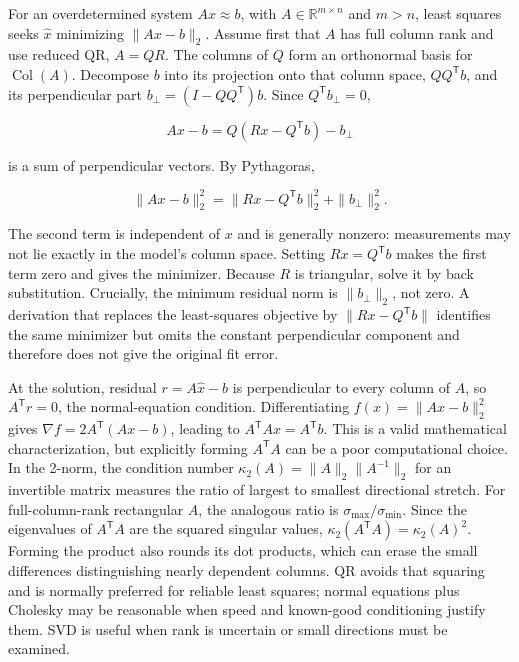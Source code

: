 \hypertarget{01-foundations-i-ch020-qr-turns-least-squares-into-a-triangular-solve-plus-an-irreducible-residual}{}

For an overdetermined system \(Ax\approx b\), with \(A\in\mathbb R^{m\times n}\) and \(m>n\), least squares seeks \(\hat x\) minimizing \(\|Ax-b\|_2\). Assume first that \(A\) has full column rank and use reduced QR, \(A=QR\). The columns of \(Q\) form an orthonormal basis for \(\operatorname{Col}(A)\). Decompose \(b\) into its projection onto that column space, \(QQ^\mathsf Tb\), and its perpendicular part \(b_\perp=(I-QQ^\mathsf T)b\). Since \(Q^\mathsf Tb_\perp=0\),

\[
Ax-b=Q(Rx-Q^\mathsf Tb)-b_\perp
\]

is a sum of perpendicular vectors. By Pythagoras,

\[
\|Ax-b\|_2^2=\|Rx-Q^\mathsf Tb\|_2^2+\|b_\perp\|_2^2.
\]

The second term is independent of \(x\) and is generally nonzero: measurements may not lie exactly in the model's column space. Setting \(Rx=Q^\mathsf Tb\) makes the first term zero and gives the minimizer. Because \(R\) is triangular, solve it by back substitution. Crucially, the minimum residual norm is \(\|b_\perp\|_2\), not zero. A derivation that replaces the least-squares objective by \(\|Rx-Q^\mathsf Tb\|\) identifies the same minimizer but omits the constant perpendicular component and therefore does not give the original fit error.

At the solution, residual \(r=A\hat x-b\) is perpendicular to every column of \(A\), so \(A^\mathsf Tr=0\), the normal-equation condition. Differentiating \(f(x)=\|Ax-b\|_2^2\) gives \(\nabla f=2A^\mathsf T(Ax-b)\), leading to \(A^\mathsf TAx=A^\mathsf Tb\). This is a valid mathematical characterization, but explicitly forming \(A^\mathsf TA\) can be a poor computational choice. In the 2-norm, the condition number \(\kappa_2(A)=\|A\|_2\|A^{-1}\|_2\) for an invertible matrix measures the ratio of largest to smallest directional stretch. For full-column-rank rectangular \(A\), the analogous ratio is \(\sigma_{\max}/\sigma_{\min}\). Since the eigenvalues of \(A^\mathsf TA\) are the squared singular values, \(\kappa_2(A^\mathsf TA)=\kappa_2(A)^2\). Forming the product also rounds its dot products, which can erase the small differences distinguishing nearly dependent columns. QR avoids that squaring and is normally preferred for reliable least squares; normal equations plus Cholesky may be reasonable when speed and known-good conditioning justify them. SVD is useful when rank is uncertain or small directions must be examined.

